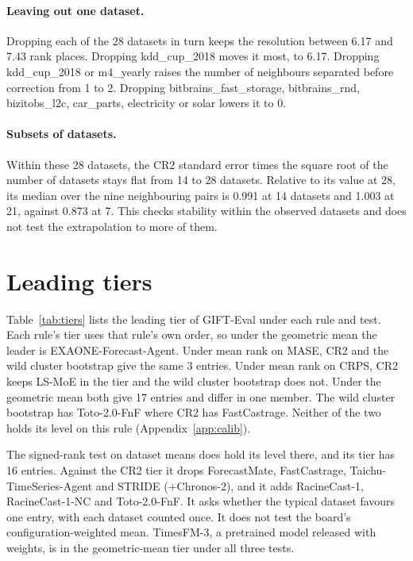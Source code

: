 \documentclass{article}
\begin{document}
\paragraph{Leaving out one dataset.} Dropping each of the 28 datasets in turn keeps the
resolution between 6.17 and 7.43 rank places. Dropping kdd\_cup\_2018 moves it most, to 6.17.
Dropping kdd\_cup\_2018 or m4\_yearly raises the number of neighbours separated before
correction from 1 to 2. Dropping bitbrains\_fast\_storage, bitbrains\_rnd, bizitobs\_l2c,
car\_parts, electricity or solar lowers it to 0.

\paragraph{Subsets of datasets.} Within these 28 datasets, the CR2 standard error times the
square root of the number of datasets stays flat from 14 to 28 datasets. Relative to its value
at 28, its median over the nine neighbouring pairs is 0.991 at 14 datasets and 1.003 at 21,
against 0.873 at 7. This checks stability within the observed datasets and does not test the
extrapolation to more of them.


\section{Leading tiers}
\label{app:tiers}

Table~\ref{tab:tiers} lists the leading tier of GIFT-Eval under each rule and test. Each rule's
tier uses that rule's own order, so under the geometric mean the leader is
EXAONE-Forecast-Agent. Under mean rank on MASE, CR2 and the wild cluster bootstrap give the
same 3 entries. Under mean rank on CRPS, CR2 keeps LS-MoE in the tier and the wild cluster
bootstrap does not. Under the geometric mean both give 17 entries and differ in one member.
The wild cluster bootstrap has Toto-2.0-FnF where CR2 has FastCastrage. Neither of the two
holds its level on this rule (Appendix~\ref{app:calib}).

The signed-rank test on dataset means does hold its level there, and its tier has 16
entries. Against the CR2 tier it drops ForecastMate, FastCastrage, Taichu-TimeSeries-Agent and
STRIDE (+Chronos-2), and it adds RacineCast-1, RacineCast-1-NC and Toto-2.0-FnF. It asks
whether the typical dataset favours one entry, with each dataset counted once. It does not
test the board's configuration-weighted mean. TimesFM-3, a pretrained model released with
weights, is in the geometric-mean tier under all three tests.
\end{document}
